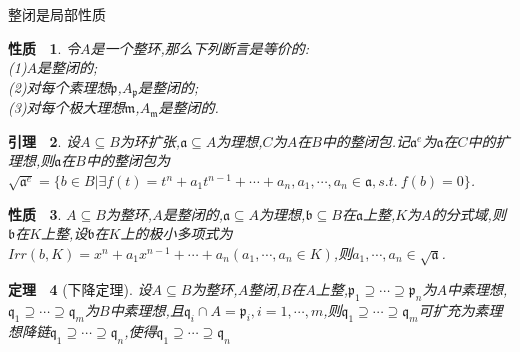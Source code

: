 \documentclass[b5paper,oneside]{ctexbook}
\newcommand{\mf}[1]{\mathfrak{#1}}
\theoremstyle{plain}
\newtheorem{thm}{定理~}[chapter]
\newtheorem{lem}[thm]{引理~}
\newtheorem{prop}[thm]{性质~}
\theoremstyle{definition}
\begin{document}
整闭是局部性质
\begin{prop}令$A$是一个整环,那么下列断言是等价的:\\
(1)$A$是整闭的;\\
(2)对每个素理想$\mf{p}$,$A_{\mf{p}}$是整闭的;\\
(3)对每个极大理想$\mf{m}$,$A_{\mf{m}}$是整闭的.
\end{prop} 
\begin{lem} 
设$A\subseteq B$为环扩张,$\mf{a}\subseteq A$为理想,$C$为$A$在$B$中的整闭包.记$\mf{a}^e$为$\mf{a}$在$C$中的扩理想,则$\mf{a}$在$B$中的整闭包为$\sqrt{\mf{a}^e}=\{b\in B|\exists f(t)=t^n+a_1t^{n-1}+\cdots+a_n,a_1,\cdots,a_n\in\mf{a},s.t.~f(b)=0\}$.
\end{lem}
\begin{prop}$A\subseteq B$为整环,$A$是整闭的,$\mf{a}\subseteq A$为理想,$\mf{b}\subseteq B$在$\mf{a}$上整,$K$为$A$的分式域,则$\mf{b}$在$K$上整,设$\mf{b}$在$K$上的极小多项式为$Irr(b,K)=x^n+a_1x^{n-1}+\cdots+a_n(a_1,\cdots,a_n\in K)$,则$a_1,\cdots,a_n\in\sqrt{\mf{a}}$.
\end{prop}
\begin{thm}[下降定理]设$A\subseteq B$为整环,$A$整闭,$B$在$A$上整,$\mf{p}_1\supseteq \cdots\supseteq \mf{p}_n$为$A$中素理想,$\mf{q}_1\supseteq \cdots\supseteq \mf{q}_m$为$B$中素理想,且$\mf{q}_i\cap A=\mf{p}_i,i=1,\cdots,m$,则$\mf{q}_1\supseteq \cdots\supseteq \mf{q}_m$可扩充为素理想降链$\mf{q}_1\supseteq \cdots\supseteq \mf{q}_n$,使得$\mf{q}_1\supseteq \cdots\supseteq \mf{q}_n$
\end{thm}
\end{document}
